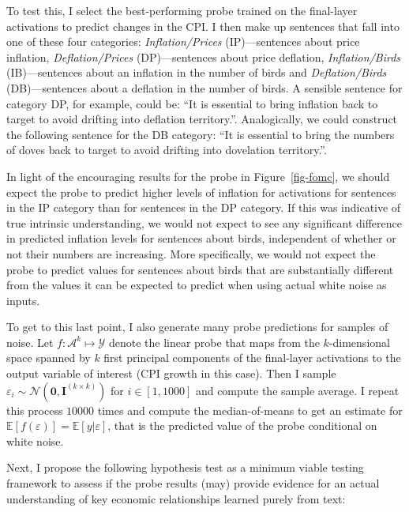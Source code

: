 \documentclass{article}
\theoremstyle{plain}
\theoremstyle{definition}
\theoremstyle{remark}
\begin{document}
To test this, I select the best-performing probe trained on the
final-layer activations to predict changes in the CPI. I then make up
sentences that fall into one of these four categories:
\emph{Inflation/Prices} (IP)---sentences about price inflation,
\emph{Deflation/Prices} (DP)---sentences about price deflation,
\emph{Inflation/Birds} (IB)---sentences about an inflation in the number
of birds and \emph{Deflation/Birds} (DB)---sentences about a deflation
in the number of birds. A sensible sentence for category DP, for
example, could be: ``It is essential to bring inflation back to target
to avoid drifting into deflation territory.''. Analogically, we could
construct the following sentence for the DB category: ``It is essential
to bring the numbers of doves back to target to avoid drifting into
dovelation territory.''.

In light of the encouraging results for the probe in
Figure~\ref{fig-fomc}, we should expect the probe to predict higher
levels of inflation for activations for sentences in the IP category
than for sentences in the DP category. If this was indicative of true
intrinsic understanding, we would not expect to see any significant
difference in predicted inflation levels for sentences about birds,
independent of whether or not their numbers are increasing. More
specifically, we would not expect the probe to predict values for
sentences about birds that are substantially different from the values
it can be expected to predict when using actual white noise as inputs.

To get to this last point, I also generate many probe predictions for
samples of noise. Let \(f: \mathcal{A}^k \mapsto \mathcal{Y}\) denote
the linear probe that maps from the \(k\)-dimensional space spanned by
\(k\) first principal components of the final-layer activations to the
output variable of interest (CPI growth in this case). Then I sample
\(\varepsilon_i \sim \mathcal{N}(\mathbf{0},\mathbf{I}^{(k \times k)})\)
for \(i \in [1,1000]\) and compute the sample average. I repeat this
process \(10000\) times and compute the median-of-means to get an
estimate for \(\mathbb{E}[f(\varepsilon)]=\mathbb{E}[y|\varepsilon]\),
that is the predicted value of the probe conditional on white noise.

Next, I propose the following hypothesis test as a minimum viable
testing framework to assess if the probe results (may) provide evidence
for an actual understanding of key economic relationships learned purely
from text:
\end{document}
